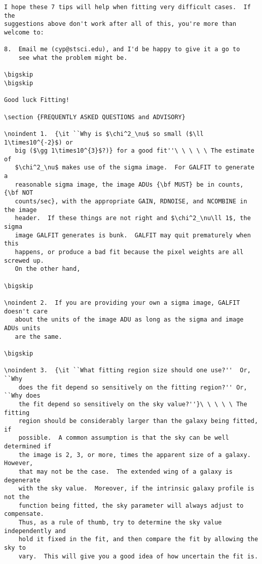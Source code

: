 \documentclass[preprint]{aastex}
\begin{document}
\begin {verbatim}
I hope these 7 tips will help when fitting very difficult cases.  If the
suggestions above don't work after all of this, you're more than
welcome to:

8.  Email me (cyp@stsci.edu), and I'd be happy to give it a go to
    see what the problem might be.

\bigskip
\bigskip

Good luck Fitting!

\section {FREQUENTLY ASKED QUESTIONS and ADVISORY}

\noindent 1.  {\it ``Why is $\chi^2_\nu$ so small ($\ll 1\times10^{-2}$) or
   big ($\gg 1\times10^{3}$?)} for a good fit''\ \ \ \ \ The estimate of
   $\chi^2_\nu$ makes use of the sigma image.  For GALFIT to generate a
   reasonable sigma image, the image ADUs {\bf MUST} be in counts, {\bf NOT
   counts/sec}, with the appropriate GAIN, RDNOISE, and NCOMBINE in the image
   header.  If these things are not right and $\chi^2_\nu\ll 1$, the sigma
   image GALFIT generates is bunk.  GALFIT may quit prematurely when this
   happens, or produce a bad fit because the pixel weights are all screwed up.
   On the other hand,

\bigskip

\noindent 2.  If you are providing your own a sigma image, GALFIT doesn't care
   about the units of the image ADU as long as the sigma and image ADUs units
   are the same.

\bigskip

\noindent 3.  {\it ``What fitting region size should one use?''  Or, ``Why
    does the fit depend so sensitively on the fitting region?'' Or, ``Why does
    the fit depend so sensitively on the sky value?''}\ \ \ \ \ The fitting
    region should be considerably larger than the galaxy being fitted, if
    possible.  A common assumption is that the sky can be well determined if
    the image is 2, 3, or more, times the apparent size of a galaxy.  However,
    that may not be the case.  The extended wing of a galaxy is degenerate
    with the sky value.  Moreover, if the intrinsic galaxy profile is not the
    function being fitted, the sky parameter will always adjust to compensate.
    Thus, as a rule of thumb, try to determine the sky value independently and
    hold it fixed in the fit, and then compare the fit by allowing the sky to
    vary.  This will give you a good idea of how uncertain the fit is.


\end{verbatim}
\end{document}
